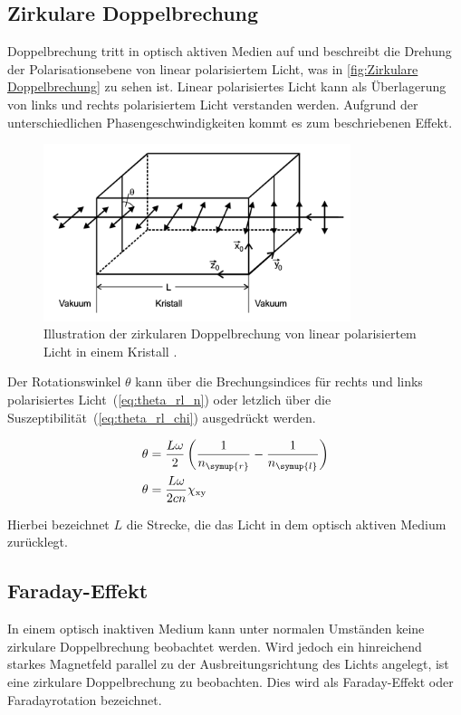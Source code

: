 \subsection{Zirkulare Doppelbrechung}
\label{subsec:Zirkulare Doppelbrechung}
Doppelbrechung tritt in optisch aktiven Medien auf und beschreibt die Drehung der Polarisationsebene von linear polarisiertem Licht, was in \autoref{fig:Zirkulare Doppelbrechung} zu 
sehen ist. Linear polarisiertes Licht kann als Überlagerung von links und rechts polarisiertem Licht verstanden werden. Aufgrund der unterschiedlichen Phasengeschwindigkeiten kommt es
zum beschriebenen Effekt.

\begin{figure}
    \centering
    \includegraphics[width=0.8\textwidth]{content/pics/Zirkulare_Doppelbrechung.png}
    \caption{Illustration der zirkularen Doppelbrechung von linear polarisiertem Licht in einem Kristall \cite{V46_Anhang}.}
    \label{fig:Zirkulare Doppelbrechung}
\end{figure}

Der Rotationswinkel $\theta$ kann über die Brechungsindices für rechts und links polarisiertes Licht~(\eqref{eq:theta_rl_n}) oder letzlich über die 
Suszeptibilität~(\eqref{eq:theta_rl_chi}) ausgedrückt werden.

\begin{align}
    \theta &= \frac{L\omega}{2}\left(\frac{1}{n_{\symup{r}}}-\frac{1}{n_{\symup{l}}}\right) \label{eq:theta_rl_n} \\
    \theta &= \frac{L\omega}{2cn}\chi_{\text{xy}} \label{eq:theta_rl_chi} 
\end{align}

Hierbei bezeichnet $L$ die Strecke, die das Licht in dem optisch aktiven Medium zurücklegt.

\subsection{Faraday-Effekt}
\label{subsec:Faraday-Effekt}
In einem optisch inaktiven Medium kann unter normalen Umständen keine zirkulare Doppelbrechung beobachtet werden. Wird jedoch ein hinreichend starkes Magnetfeld parallel
zu der Ausbreitungsrichtung des Lichts angelegt, ist eine zirkulare Doppelbrechung zu beobachten. Dies wird als Faraday-Effekt oder Faradayrotation bezeichnet.

